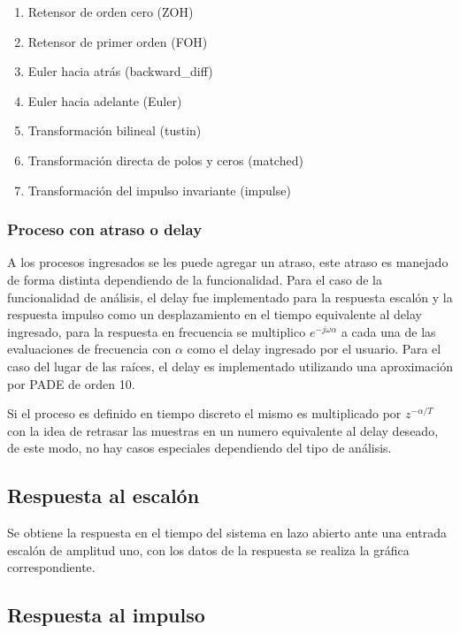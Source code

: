         \begin{enumerate}[leftmargin=\parindent]
            \item Retensor de orden cero  (ZOH)
            \item Retensor de primer orden (FOH)
            \item Euler hacia atrás (backward\_diff)
            \item Euler hacia adelante (Euler)
            \item Transformación bilineal (tustin)
            \item Transformación directa de polos y ceros (matched)
            \item Transformación del impulso invariante (impulse)
        \end{enumerate}

    \subsubsection{Proceso con atraso o delay}
        
        A los procesos ingresados se les puede agregar un atraso, este atraso es manejado de forma distinta dependiendo de la funcionalidad. Para el caso de la funcionalidad de análisis, el delay fue implementado para la respuesta escalón y la respuesta impulso como un desplazamiento en el tiempo equivalente al delay ingresado, para la respuesta en frecuencia se multiplico $e^{-j\omega \alpha}$ a cada una de las evaluaciones de frecuencia con $\alpha$ como el delay ingresado por el usuario. Para el caso del lugar de las raíces, el delay es implementado utilizando una aproximación por PADE de orden 10.

        Si el proceso es definido en tiempo discreto el mismo es multiplicado por $z^{-\alpha/T}$ con la idea de retrasar las muestras en un numero equivalente al delay deseado, de este modo, no hay casos especiales dependiendo del tipo de análisis.

    \subsection{Respuesta al escalón}
        
        Se obtiene la respuesta en el tiempo del sistema en lazo abierto ante una entrada escalón de amplitud uno, con los datos de la respuesta se realiza la gráfica correspondiente.
    
    \subsection{Respuesta al impulso}
        
